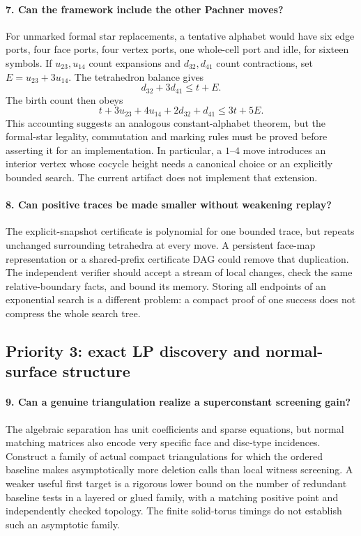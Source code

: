 \paragraph{7. Can the framework include the other Pachner moves?}
For unmarked formal star replacements, a tentative alphabet would have
six edge ports, four face ports, four vertex ports, one whole-cell port
and idle, for sixteen symbols. If $u_{23},u_{14}$ count expansions and
$d_{32},d_{41}$ count contractions, set $E=u_{23}+3u_{14}$. The tetrahedron
balance gives
\[
 d_{32}+3d_{41}\le t+E.
\]
The birth count then obeys
\[
 t+3u_{23}+4u_{14}+2d_{32}+d_{41}\le3t+5E.
\]
This accounting suggests an analogous constant-alphabet theorem, but the
formal-star legality, commutation and marking rules must be proved before
asserting it for an implementation. In particular, a $1$--$4$ move introduces
an interior vertex whose cocycle height needs a canonical choice or an
explicitly bounded search. The current artifact does not implement that
extension.

\paragraph{8. Can positive traces be made smaller without weakening replay?}
The explicit-snapshot certificate is polynomial for one bounded trace, but
repeats unchanged surrounding tetrahedra at every move. A persistent face-map
representation or a shared-prefix certificate DAG could remove that
duplication. The independent verifier should accept a stream of local changes,
check the same relative-boundary facts, and bound its memory. Storing all
endpoints of an exponential search is a different problem: a compact proof
of one success does not compress the whole search tree.

\subsection{Priority 3: exact LP discovery and normal-surface structure}

\paragraph{9. Can a genuine triangulation realize a superconstant screening gain?}
The algebraic separation has unit coefficients and sparse equations, but
normal matching matrices also encode very specific face and disc-type
incidences. Construct a family of actual compact triangulations for which
the ordered baseline makes asymptotically more deletion calls than local
witness screening. A weaker useful first target is a rigorous lower bound
on the number of redundant baseline tests in a layered or glued family,
with a matching positive point and independently checked topology. The
finite solid-torus timings do not establish such an asymptotic family.

